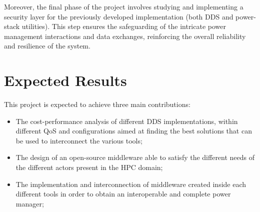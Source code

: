 Moreover, the final phase of the project involves studying and implementing a security layer for the previously developed implementation (both DDS and power-stack utilities). This step ensures the safeguarding of the intricate power management interactions and data exchanges, reinforcing the overall reliability and resilience of the system.

\section{Expected Results}
This project is expected to achieve three main contributions:
\begin{itemize}
    \item The cost-performance analysis of different DDS implementations, within different QoS and configurations aimed at finding the best solutions that can be used to interconnect the various tools;

    \item The design of an open-source middleware able to satisfy the different needs of the different actors present in the HPC domain;

    \item The implementation and interconnection of middleware created inside each different tools in order to obtain an interoperable and complete power manager;
\end{itemize}

